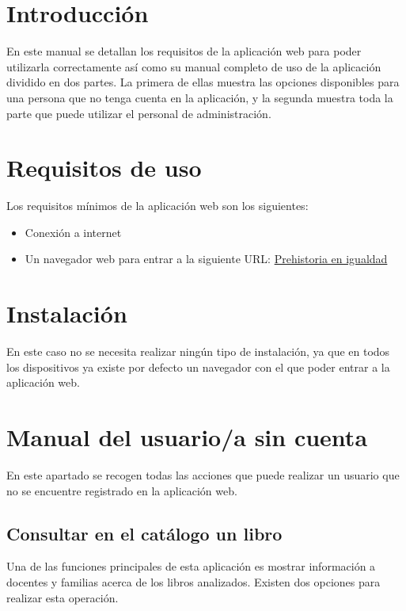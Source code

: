 
\section{Introducción}
En este manual se detallan los requisitos de la aplicación web para poder utilizarla correctamente así como su manual completo de uso de la aplicación dividido en dos partes. La primera de ellas muestra las opciones disponibles para una persona que no tenga cuenta en la aplicación, y la segunda muestra toda la parte que puede utilizar el personal de administración.
\section{Requisitos de uso}
Los requisitos mínimos de la aplicación web son los siguientes:
\begin{itemize}
    \item Conexión a internet
    \item Un navegador web para entrar a la siguiente URL: \href{https://prehistoriaenigualdad.netlify.app/}{Prehistoria en igualdad}
\end{itemize}
\section{Instalación}
En este caso no se necesita realizar ningún tipo de instalación, ya que en todos los dispositivos ya existe por defecto un navegador con el que poder entrar a la aplicación web.
\section{Manual del usuario/a sin cuenta}
En este apartado se recogen todas las acciones que puede realizar un usuario que no se encuentre registrado en la aplicación web.

\subsection{Consultar en el catálogo un libro}
Una de las funciones principales de esta aplicación es mostrar información a docentes y familias acerca de los libros analizados. Existen dos opciones para realizar esta operación.


